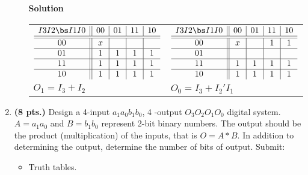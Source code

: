 \begin{enumerate}
\begin{itemize}
                \begin{onlysolution}  \textbf{Solution} \itshape{
                        \begin{tabular}{ll}
                            $
                            \begin{array} {c||c|c|c|c}
                                I3 I2 \bs I1 I0 & 00 & 01 & 11 & 10 \\ \hline \hline
                                00        & x  &    &    &    \\ \hline
                                01        & 1  & 1  & 1  & 1  \\ \hline
                                11        & 1  & 1  & 1  & 1  \\ \hline
                                10        & 1  & 1  & 1  & 1  \\
                            \end{array} $ &
                            $
                            \begin{array} {c||c|c|c|c}
                                I3 I2 \bs I1 I0 & 00 & 01 & 11 & 10 \\ \hline \hline
                                00        & x  &    & 1  & 1  \\ \hline
                                01        &    &    &    &    \\ \hline
                                11        & 1  & 1  & 1  & 1  \\ \hline
                                10        & 1  & 1  & 1  & 1  \\
                            \end{array} $ \\
                            $O_1 = I_3 + I_2$ & $O_0=I_3 + I_2'I_1$ \\
                        \end{tabular}
                    }
                \end{onlysolution}
        \end{itemize}

    \item \textbf{ (8 pts.)}
        Design a 4-input $a_1 a_0 b_1 b_0$, 4 -output $O_3 O_2 O_1 O_0$
        digital system.  $A=a_1 a_0$ and $B=b_1 b_0$ represent 2-bit binary
        numbers.  The output should be the product (multiplication) of the inputs,
        that is $O = A*B$.  In addition to determining the output, determine the
        number of bits of output. Submit:
        \begin{itemize}
            \item Truth tables.


\end{itemize}
\end{enumerate}
